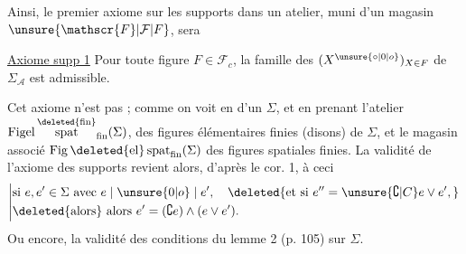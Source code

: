 
Ainsi, le premier axiome sur les supports dans un atelier, muni d'un magasin  $\unsure{\mathscr{F}|\mathcal{F}|F}$, sera

\uline{Axiome supp 1} Pour toute figure $F\in\mathscr{F}_{c}$, la famille des $(X^{\unsure{\circ|0|o}})_{X\in F}$ de $\Sigma_{\mathcal{A}}$ est admissible.

Cet axiome n'est pas ; comme on voit en  d'un  $\Sigma$, et en prenant l'atelier $\operatorname{Figel}\overset{\deleted{\mathrm{fin}}}{\operatorname{spat}}_{\mathrm{fin}}(\Sigma)$,  des figures élémentaires finies (disons) de $\Sigma$, et le magasin  associé $\operatorname{Fig}\deleted{\mathrm{el}}\operatorname{spat}_{\mathrm{fin}}(\Sigma)$ des figures spatiales finies. La validité de l'axiome des supports revient alors, d'après le cor. 1, à ceci
\[
\left\vert\begin{aligned}
&\text{si }e,e'\in\Sigma\text{ avec }e\mid\unsure{0|o}\mid e',\quad
\deleted{\text{et si }e''=\unsure{\complement|C}e\vee e',}\\
&\deleted{\text{alors}}\ \text{alors }e'=(\complement e)\wedge(e\vee e').
\end{aligned}\right.
\]
Ou encore, la validité des conditions du lemme 2 (p. 105) sur $\Sigma$.
